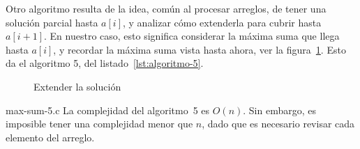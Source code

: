 \documentclass[english, spanish, fleqn, 10pt]{article}
\numberwithin{equation}{section}
\newcommand{\nparentesis}[1]{\left( #1 \right)}
\theoremstyle{definition}
\begin{document}
  Otro algoritmo resulta de la idea,
  común al procesar arreglos,
  de tener una solución parcial hasta \(a[i]\),
  y analizar cómo extenderla para cubrir hasta \(a[i + 1]\).
  En nuestro caso,
  esto significa considerar la máxima suma que llega hasta \(a[i]\),
  y recordar la máxima suma vista hasta ahora,
  ver la figura~\ref{fig:Algoritmo-5}.
  Esto da el algoritmo 5,
  del listado~\ref{lst:algoritmo-5}.
  \begin{figure}[ht]
    \centering
    \caption{Extender la solución}
    \label{fig:Algoritmo-5}
  \end{figure}

  
                  {max-sum-5.c}
La complejidad del algoritmo~5 es $O\nparentesis{n}$. Sin embargo, es imposible tener una complejidad menor que $n$, dado que es necesario revisar cada elemento del arreglo.
\end{document}

